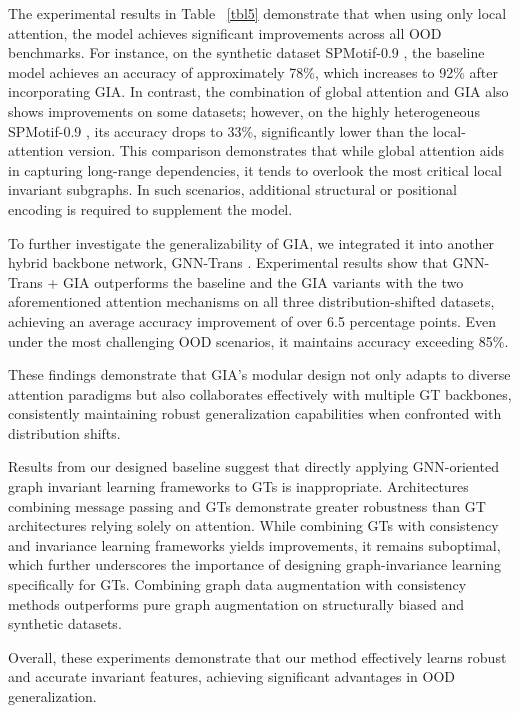 \documentclass[a4paper,fleqn]{cas-dc}
\begin{document}
The experimental results in Table ~\ref{tbl5} demonstrate that when using only local attention, the model achieves significant improvements across all OOD benchmarks. For instance, on the synthetic dataset SPMotif-0.9 \cite{wu2022discovering}, the baseline model achieves an accuracy of approximately 78\%, which increases to 92\% after incorporating GIA. In contrast, the combination of global attention and GIA also shows improvements on some datasets; however, on the highly heterogeneous SPMotif-0.9 \cite{wu2022discovering}, its accuracy drops to 33\%, significantly lower than the local-attention version. This comparison demonstrates that while global attention aids in capturing long-range dependencies, it tends to overlook the most critical local invariant subgraphs. In such scenarios, additional structural or positional encoding is required to supplement the model.

To further investigate the generalizability of GIA, we integrated it into another hybrid backbone network, GNN-Trans \cite{wu2021representing}. Experimental results show that GNN-Trans + GIA outperforms the baseline and the GIA variants with the two aforementioned attention mechanisms on all three distribution-shifted datasets, achieving an average accuracy improvement of over 6.5 percentage points. Even under the most challenging OOD scenarios, it maintains accuracy exceeding 85\%.

{\color{blue}These findings demonstrate that GIA's modular design not only adapts to diverse attention paradigms but also collaborates effectively with multiple GT backbones, consistently maintaining robust generalization capabilities when confronted with distribution shifts.



Results from our designed baseline suggest that directly applying GNN-oriented graph invariant learning frameworks to GTs is inappropriate. Architectures combining message passing and GTs demonstrate greater robustness than GT architectures relying solely on attention. While combining GTs with consistency and invariance learning frameworks yields improvements, it remains suboptimal, which further underscores the importance of designing graph-invariance learning specifically for GTs. Combining graph data augmentation with consistency methods outperforms pure graph augmentation on structurally biased and synthetic datasets.}



Overall, these experiments demonstrate that our method effectively learns robust and accurate invariant features, achieving significant advantages in OOD generalization.
\end{document}
